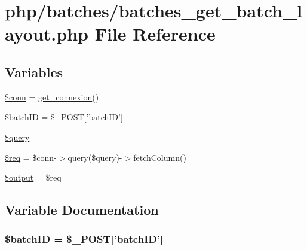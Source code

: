\hypertarget{batches__get__batch__layout_8php}{\section{php/batches/batches\-\_\-get\-\_\-batch\-\_\-layout.php File Reference}
\label{batches__get__batch__layout_8php}
}
\subsection*{Variables}
\begin{DoxyCompactItemize}
\item 
\hyperlink{batches__get__batch__layout_8php_aa8a5a87b9c1a6a0819b88447cbe41877}{\$conn} = \hyperlink{php__functions_8php_ace18bc10f3fd08f92688ac743e0d8c2e}{get\-\_\-connexion}()
\item 
\hyperlink{batches__get__batch__layout_8php_aaa6d122ea9cb55b210aadd86e5654a74}{\$batch\-I\-D} = \$\-\_\-\-P\-O\-S\-T\mbox{[}'\hyperlink{obsolete_2processing__bak_8php_a88c5bc4262b7c34f236357f5c53fc99b}{batch\-I\-D}'\mbox{]}
\item 
\hyperlink{batches__get__batch__layout_8php_af59a5f7cd609e592c41dc3643efd3c98}{\$query}
\item 
\hyperlink{batches__get__batch__layout_8php_a63a7a283ea5dee8af1e2d5a3435bf370}{\$req} = \$conn-\/$>$query(\$query)-\/$>$fetch\-Column()
\item 
\hyperlink{batches__get__batch__layout_8php_a73004ce9cd673c1bfafd1dc351134797}{\$output} = \$req
\end{DoxyCompactItemize}


\subsection{Variable Documentation}
\hypertarget{batches__get__batch__layout_8php_aaa6d122ea9cb55b210aadd86e5654a74}{
\subsubsection[{\$batch\-I\-D}]{\setlength{\rightskip}{0pt plus 5cm}\${\bf batch\-I\-D} = \$\-\_\-\-P\-O\-S\-T\mbox{[}'{\bf batch\-I\-D}'\mbox{]}}}\label{batches__get__batch__layout_8php_aaa6d122ea9cb55b210aadd86e5654a74}


